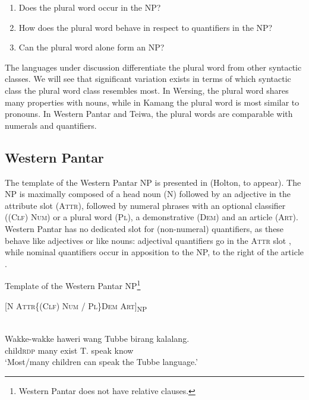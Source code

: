 \begin{enumerate}
\item Does the plural word occur in the NP?
\item  How does the plural word behave in respect to quantifiers in the NP?
\item   Can the plural word alone form an NP?
\end{enumerate}

The languages under discussion differentiate the plural word from other syntactic classes. We will see that significant variation exists in terms of which syntactic class the plural word class resembles most. In Wersing, the plural word shares many properties with nouns, while in Kamang the plural word is most similar to pronouns. In Western Pantar and Teiwa, the plural words are comparable with numerals and quantifiers.

\subsection{Western Pantar}  %
\label{sec:9:3.1}
The template of the Western Pantar NP is presented in  (Holton, to appear). The NP is maximally composed of a head noun (N) followed by an adjective in the attribute slot (\textsc{Attr),} followed by numeral phrases with an optional classifier (\textsc{(Clf)} \textsc{Num)} or a plural word (\textsc{Pl),} a demonstrative \textsc{(Dem)} and an article \textsc{(Art)}. Western Pantar has no dedicated slot for (non-numeral) quantifiers, as these behave like adjectives or like nouns: adjectival quantifiers go in the A\textsc{ttr} slot , while nominal quantifiers occur in apposition to the NP, to the right of the article .

\ea\label{ex:9:12}
\upshape
Template of the Western Pantar NP\footnote{Western Pantar does not have relative clauses.}

 [\textsc{N  Attr\{(Clf) Num / Pl\}Dem  Art]}\textsc{\textsubscript{NP}}
 
\z


\ea%
\label{ex:9:13}
 \\
\gll  Wakke-wakke haweri wang Tubbe birang kalalang. \\
   child{\Tilde}\textsc{rdp} many exist T. speak know  \\
\glt `Most/many children can speak the Tubbe language.'
\z







